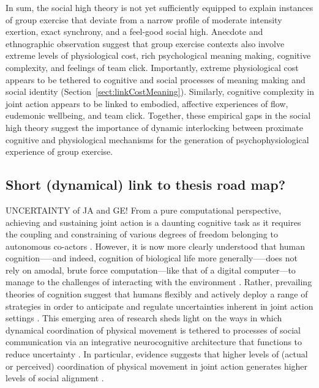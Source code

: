 \begin{CJK}{UTF8}{gbsn}
In sum, the social high theory is not yet sufficiently equipped to explain instances of group exercise that deviate from a narrow profile of moderate intensity exertion, exact synchrony, and a feel-good social high.  Anecdote and ethnographic observation suggest that group exercise contexts also involve extreme levels of physiological cost, rich psychological meaning making, cognitive complexity, and feelings of team click.  Importantly, extreme physiological cost appears to be tethered to cognitive and social processes of meaning making and social identity (Section~\ref{sect:linkCostMeaning}).  Similarly, cognitive complexity in joint action appears to be linked to embodied, affective experiences of flow, eudemonic wellbeing, and team click.  Together, these empirical gaps in the social high theory suggest the importance of dynamic interlocking between proximate cognitive and physiological mechanisms for the generation of psychophysiological experience of group exercise.


\subsection{Short (dynamical) link to thesis road map?}


UNCERTAINTY of JA and GE!
From a pure computational perspective, achieving and sustaining joint action is a daunting cognitive task as it requires the coupling and constraining of various degrees of freedom belonging to autonomous co-actors \citep{Bernstein1967,Turvey1978}.  However, it is now more clearly understood that human cognition—--and indeed, cognition of biological life more generally—--does not rely on amodal, brute force computation---like that of a digital computer---to manage to the challenges of interacting with the environment \citep{Yufik2013}.  Rather, prevailing theories of cognition suggest that humans flexibly and actively deploy a range of strategies in order to anticipate and regulate uncertainties inherent in joint action settings \citep{Semin2008,Friston2010,Clark2015}.
This emerging area of research sheds light on the ways in which dynamical coordination of physical movement is tethered to processes of social communication via an integrative neurocognitive architecture that functions to reduce uncertainty \citep{Semin2008,Wheatley2016,Ramstead2016}.
In particular, evidence suggests that higher levels of (actual or perceived) coordination of physical movement in joint action generates higher levels of social alignment \citep[]{Semin2008,Wheatley2012,Launay2016,Mogan2017}.



\end{CJK}
